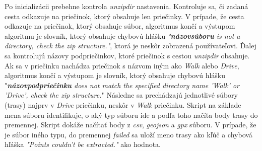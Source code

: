 Po inicializácii prebehne kontrola \textit{unzipdir} nastavenia. Kontroluje sa, či zadaná cesta odkazuje na priečinok, ktorý obsahuje len priečinky. V prípade, že cesta odkazuje na priečinok, ktorý obsahuje súbor, algoritmus končí a výstupom algoritmu je slovník, ktorý obsahuje chybovú hlášku \textit{"\textbf{názov\textunderscore súboru} is not a directory, check the zip structure."}, ktorá je neskôr zobrazená používateľovi. Ďalej sa kontrolujú názovy podpriečinkov, ktoré priečinok s cestou \textit{unzipdir} obsahuje. Ak sa v priečinku nachádza priečinok s názvom iným ako \textit{Walk} alebo \textit{Drive}, algoritmus končí a výstupom je slovník, ktorý obsahuje chybovú hlášku "\textit{\textbf{názov\textunderscore podpriečinku} does not match the specified directory name 'Walk' or 'Drive', check the zip structure.}" Následne sa prechádzajú jednotlivé súbory (trasy) najprv v \textit{Drive} priečinku, neskôr v \textit{Walk} priečinku. Skript na základe mena súboru identifikuje, o aký typ súboru ide a podľa toho načíta body trasy do premennej. Skript dokáže načítať body z \textit{csv}, \textit{geojson} a \textit{gpx} súboru. V prípade, že je súbor iného typu, do premennej \textit{failed} sa uloží meno trasy ako kľúč a chybová hľáška \textit{"Points couldn't be extracted."}  ako hodnota.

